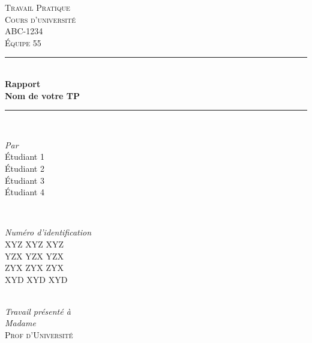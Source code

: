 %
%

\begin{titlepage}

\newcommand{\HRule}{\rule{\linewidth}{0.5mm}} %

\center %
\textsc{\LARGE Travail Pratique}\\[1.0cm] 
\textsc{\Large Cours d'université}\\[0.2cm] 
\textsc{\large ABC-1234}\\[0.7cm]
\textsc{\large Équipe 55}\\[0.7cm]

\HRule \\[0.4cm]
{ \Large \bfseries Rapport}\\[0.20cm] { \huge \bfseries Nom de votre TP}\\[0.20cm]

\HRule \\[2cm]

\begin{minipage}{0.4\textwidth}
    \begin{flushleft} \large
    \emph{Par}\\
        Étudiant \textsc{1}\\
        Étudiant \textsc{2}\\
        Étudiant \textsc{3}\\
        Étudiant \textsc{4}\\
    \end{flushleft}
\end{minipage}
~
\begin{minipage}{0.4\textwidth}
    \begin{flushright} \large
    \emph{Numéro d'identification}\\
        XYZ XYZ XYZ\\
        YZX YZX YZX\\
        ZYX ZYX ZYX\\
        XYD XYD XYD\\
    \end{flushright}
\end{minipage} \\[1.0cm]

\emph{Travail présenté à} \\
\emph{Madame} \\[0.1cm]
\textsc{\Large Prof \textsc{d'Université}}\\[1.0cm]
    

\end{titlepage}
